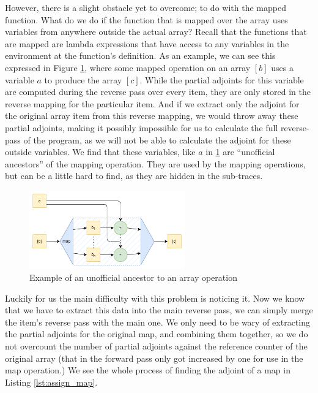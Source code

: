             However, there is a slight obstacle yet to overcome; to do with the mapped function.
            What do we do if the function that is mapped over the array uses variables from anywhere outside the actual array?
            Recall that the functions that are mapped are lambda expressions that have access to any variables in the environment at the function's definition.
            As an example, we can see this expressed in Figure \ref{fig:map_graph}, where some mapped operation on an array $[b]$ uses a variable $a$ to produce the array $[c]$.
            While the partial adjoints for this variable are computed during the reverse pass over every item, they are only stored in the reverse mapping for the particular item.
            And if we extract only the adjoint for the original array item from this reverse mapping, we would throw away these partial adjoints, making it possibly impossible for us to calculate the full reverse-pass of the program, as we will not be able to calculate the adjoint for these outside variables.
            We find that these variables, like $a$ in \ref{fig:map_graph} are ``unofficial ancestors'' of the mapping operation.
            They are used by the mapping operations, but can be a little hard to find, as they are hidden in the sub-traces.

            \begin{figure}[htb]
                \centering
                \includegraphics[width=0.6\textwidth]{diagrams/map_example.png}
                \caption{Example of an unofficial ancestor to an array operation}
                \label{fig:map_graph}
            \end{figure}

            Luckily for us the main difficulty with this problem is noticing it.
            Now we know that we have to extract this data into the main reverse pass, we can simply merge the item's reverse pass with the main one.
            We only need to be wary of extracting the partial adjoints for the original map, and combining them together, so we do not overcount the number of partial adjoints against the reference counter of the original array (that in the forward pass only got increased by one for use in the map operation.)
            We see the whole process of finding the adjoint of a map in Listing \ref{lst:assign_map}.

